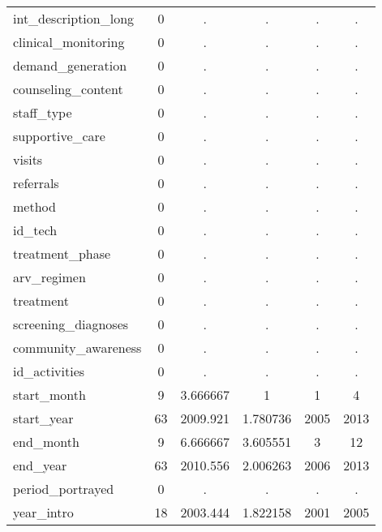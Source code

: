 \begin{table}[htbp]
\begin{tabular}{l*{1}{ccccc}}
int\_description\_long&           0&           .&           .&           .&           .\\
clinical\_monitoring&           0&           .&           .&           .&           .\\
demand\_generation&           0&           .&           .&           .&           .\\
counseling\_content&           0&           .&           .&           .&           .\\
staff\_type  &           0&           .&           .&           .&           .\\
supportive\_care&           0&           .&           .&           .&           .\\
visits      &           0&           .&           .&           .&           .\\
referrals   &           0&           .&           .&           .&           .\\
method      &           0&           .&           .&           .&           .\\
id\_tech     &           0&           .&           .&           .&           .\\
treatment\_phase&           0&           .&           .&           .&           .\\
arv\_regimen &           0&           .&           .&           .&           .\\
treatment   &           0&           .&           .&           .&           .\\
screening\_diagnoses&           0&           .&           .&           .&           .\\
community\_awareness&           0&           .&           .&           .&           .\\
id\_activities&           0&           .&           .&           .&           .\\
start\_month &           9&    3.666667&           1&           1&           4\\
start\_year  &          63&    2009.921&    1.780736&        2005&        2013\\
end\_month   &           9&    6.666667&    3.605551&           3&          12\\
end\_year    &          63&    2010.556&    2.006263&        2006&        2013\\
period\_portrayed&           0&           .&           .&           .&           .\\
year\_intro  &          18&    2003.444&    1.822158&        2001&        2005\\

\end{tabular}
\end{table}
